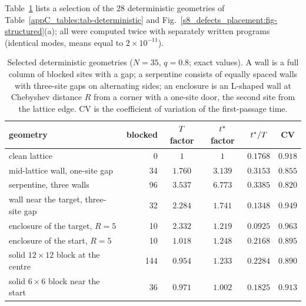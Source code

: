 Table~\ref{s8_defects_placement:tab-det} lists a selection of the 28 deterministic geometries of
Table~\ref{appC_tables:tab-deterministic} and Fig.~\ref{s8_defects_placement:fig-structured}(a); all were computed
twice with separately written programs (identical modes, means equal to $2\times10^{-11}$).

\begin{table}[tbp]
\centering
\caption{Selected deterministic geometries ($N=35$, $q=0.8$; exact values). A wall is a full column of blocked
sites with a gap; a serpentine consists of equally spaced walls with three-site gaps on alternating sides; an
enclosure is an L-shaped wall at Chebyshev distance $R$ from a corner with a one-site door, the second site from
the lattice edge. CV is the coefficient of variation of the first-passage time.}
\label{s8_defects_placement:tab-det}
\begin{tabular}{lrcccc}
\toprule
geometry & blocked & $T$ factor & $t^{*}$ factor & $t^{*}/T$ & CV\\
\midrule
clean lattice                                   &   0 & $1$     & $1$     & $0.1768$ & $0.918$\\
mid-lattice wall, one-site gap                  &  34 & $1.760$ & $3.139$ & $0.3153$ & $0.855$\\
serpentine, three walls                         &  96 & $3.537$ & $6.773$ & $0.3385$ & $0.820$\\
wall near the target, three-site gap            &  32 & $2.284$ & $1.741$ & $0.1348$ & $0.949$\\
enclosure of the target, $R=5$                  &  10 & $2.332$ & $1.219$ & $0.0925$ & $0.963$\\
enclosure of the start, $R=5$                   &  10 & $1.018$ & $1.248$ & $0.2168$ & $0.895$\\
solid $12\times12$ block at the centre          & 144 & $0.954$ & $1.233$ & $0.2284$ & $0.890$\\
solid $6\times6$ block near the start           &  36 & $0.971$ & $1.002$ & $0.1825$ & $0.913$\\
\bottomrule
\end{tabular}
\end{table}

